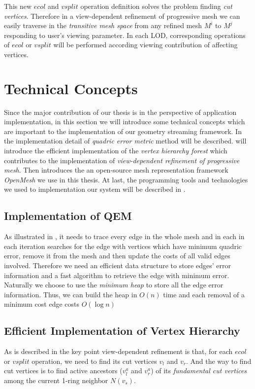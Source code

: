 This new $ecol$ and $vsplit$ operation definition solves the problem finding \emph{cut vertices}. Therefore in a view-dependent refinement of progressive mesh we can easily traverse in the \emph{transitive mesh space} from any refined mesh $M^i$ to $M^j$ responding to user's viewing parameter. In each LOD, corresponding operations of $ecol$ or $vsplit$ will be performed according viewing contribution of affecting vertices. 


\section{Technical Concepts}
\label{section:TechConcpt}
Since the major contribution of our thesis is in the perspective of application implementation, in this section we will introduce some technical concepts which are important to the implementation of our geometry streaming framework. In  the implementation detail of \emph{quadric error metric} method will be described.  will introduce the efficient implementation of the \emph{vertex hierarchy forest} which contributes to the implementation of \emph{view-dependent refinement of progressive mesh}. Then  introduces the an open-source mesh representation framework \emph{OpenMesh} we use in this thesis. At last, the programming tools and technologies we used to implementation our system will be described in .

\subsection{Implementation of QEM}
\label{section:implQEM}
As illustrated in , it needs to trace every edge in the whole mesh and in each in each iteration searches for the edge with vertices which have minimum quadric error, remove it from the mesh and then update the costs of all valid edges involved. Therefore we need an efficient data structure to store edges' error information and a fast algorithm to retrieve the edge with minimum error. Naturally we choose to use the \emph{minimum heap} to store all the edge error information. Thus, we can build the heap in $O(n)$ time and each removal of a minimum cost edge costs $O(\log{n})$

\subsection{Efficient Implementation of Vertex Hierarchy}
\label{section:implVH}
As is described in  the key point view-dependent refinement is that, for each $ecol$ or $vsplit$ operation, we need to find its cut vertices $v_l$ and $v_r$. And the way to find cut vertices is to find active ancestors ($v^a_l$ and $v^a_r$) of its \emph{fundamental cut vertices} among the current 1-ring neighbor $N(v_s)$. 

